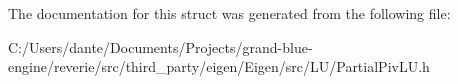 The documentation for this struct was generated from the following file\+:\begin{DoxyCompactItemize}
\item 
C\+:/\+Users/dante/\+Documents/\+Projects/grand-\/blue-\/engine/reverie/src/third\+\_\+party/eigen/\+Eigen/src/\+L\+U/Partial\+Piv\+L\+U.\+h\end{DoxyCompactItemize}
